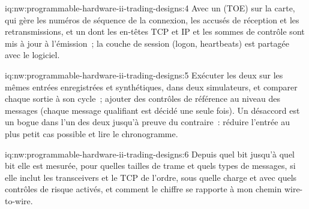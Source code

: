 \begin{solution}{iq:nw:programmable-hardware-ii-trading-designs:4}
Avec un  (TOE) sur la carte, qui gère les numéros de séquence de la connexion, les accusés de réception et les retransmissions, et un 
dont les en-têtes TCP et IP et les sommes de contrôle sont mis à jour à l'émission~; la couche de session (logon, heartbeats) est partagée avec le logiciel.
\end{solution}

\begin{solution}{iq:nw:programmable-hardware-ii-trading-designs:5}
Exécuter les deux sur les mêmes entrées enregistrées et synthétiques, dans deux simulateurs, et comparer chaque sortie à son cycle~; ajouter des contrôles de référence
au niveau des messages (chaque message qualifiant est décidé une seule fois). Un désaccord est un bogue dans l'un des deux jusqu'à preuve du contraire~: réduire l'entrée au
plus petit cas possible et lire le chronogramme.
\end{solution}

\begin{solution}{iq:nw:programmable-hardware-ii-trading-designs:6}
Depuis quel bit jusqu'à quel bit elle est mesurée, pour quelles tailles de trame et quels types de messages, si elle inclut les transceivers et le
TCP de l'ordre, sous quelle charge et avec quels contrôles de risque activés, et comment le chiffre se rapporte à mon chemin wire-to-wire.
\end{solution}
